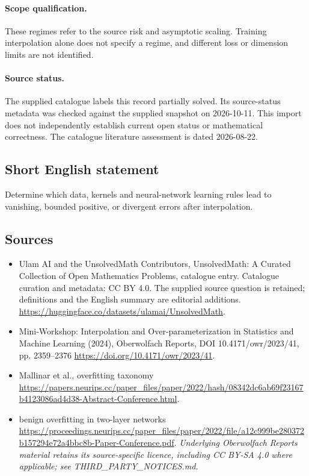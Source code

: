 \documentclass[11pt]{article}
\begin{document}
\paragraph{Scope qualification.}
These regimes refer to the source risk and asymptotic scaling. Training interpolation alone does not specify a regime, and different loss or dimension limits are not identified.
\paragraph{Source status.}
The supplied catalogue labels this record partially solved. Its source-status metadata was checked against the supplied snapshot on 2026-10-11. This import does not independently establish current open status or mathematical correctness. The catalogue literature assessment is dated 2026-08-22.
\subsection{Short English statement}
Determine which data, kernels and neural-network learning rules lead to vanishing, bounded positive, or divergent errors after interpolation.
\subsection{Sources}
\begin{itemize}
\item[S1] Ulam AI and the UnsolvedMath Contributors, UnsolvedMath: A Curated Collection of Open Mathematics Problems, catalogue entry. Catalogue curation and metadata: CC BY 4.0. The supplied source question is retained; definitions and the English summary are editorial additions.
\url{https://huggingface.co/datasets/ulamai/UnsolvedMath}.
\item[S2] Mini-Workshop: Interpolation and Over-parameterization in Statistics and Machine Learning​ (2024), Oberwolfach Reports, DOI 10.4171/owr/2023/41, pp. 2359--2376
\url{https://doi.org/10.4171/owr/2023/41}.
\item[S3] Mallinar et al., overfitting taxonomy
\url{https://papers.neurips.cc/paper_files/paper/2022/hash/08342dc6ab69f23167b4123086ad4d38-Abstract-Conference.html}.
\item[S4] benign overfitting in two-layer networks
\url{https://proceedings.neurips.cc/paper_files/paper/2022/file/a12c999be280372b157294e72a4bbc8b-Paper-Conference.pdf}.
\textit{Underlying Oberwolfach Reports material retains its source-specific licence, including CC BY-SA 4.0 where applicable; see THIRD\_PARTY\_NOTICES.md.}
\end{itemize}
\end{document}
